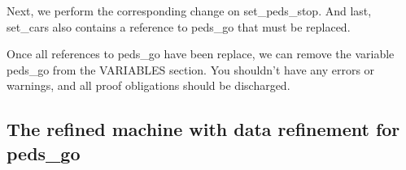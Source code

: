 Next, we perform the corresponding change on \textsf{set\_peds\_stop}.  And last, \textsf{set\_cars} also contains a reference to \textsf{peds\_go} that must be replaced.

Once all references to \textsf{peds\_go} have been replace, we can remove the variable \textsf{peds\_go} from the \textsf{VARIABLES} section.  You shouldn't have any errors or warnings, and all proof obligations should be discharged.


\subsection{The refined machine with data refinement for peds\_go}

